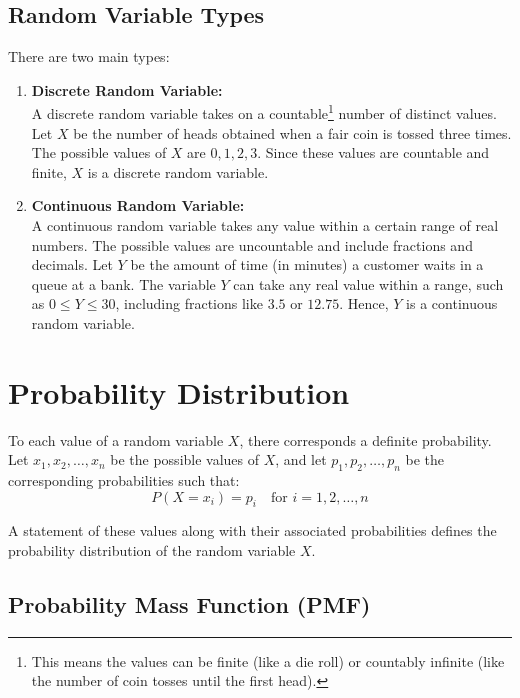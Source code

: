 \documentclass[twoside]{book}
\begin{document}
\subsection{Random Variable Types}

There are two main types:

\begin{enumerate}
    \item \textbf{Discrete Random Variable:} \\
    A discrete random variable takes on a countable\footnote{This means the values can be finite (like a die roll) or countably infinite (like the number of coin tosses until the first head).} number of distinct values. Let \( X \) be the number of heads obtained when a fair coin is tossed three times.
    The possible values of \( X \) are \( 0, 1, 2, 3 \). Since these values are countable and finite, \( X \) is a discrete random variable.

    \item \textbf{Continuous Random Variable:} \\
    A continuous random variable takes any value within a certain range of real numbers. The possible values are uncountable and include fractions and decimals. Let \( Y \) be the amount of time (in minutes) a customer waits in a queue at a bank.
    The variable \( Y \) can take any real value within a range, such as \( 0 \leq Y \leq 30 \), including fractions like \( 3.5 \) or \( 12.75 \). Hence, \( Y \) is a continuous random variable.
\end{enumerate}

\section{Probability Distribution}

To each value of a random variable \( X \), there corresponds a definite probability.
Let \( x_1, x_2, \dots, x_n \) be the possible values of \( X \), and let \( p_1, p_2, \dots, p_n \) be the corresponding probabilities such that:
\[
P(X = x_i) = p_i \quad \text{for } i = 1, 2, \dots, n
\]

A statement of these values along with their associated probabilities defines the {probability distribution} of the random variable \( X \).

\subsection{Probability Mass Function (PMF)}
\end{document}
